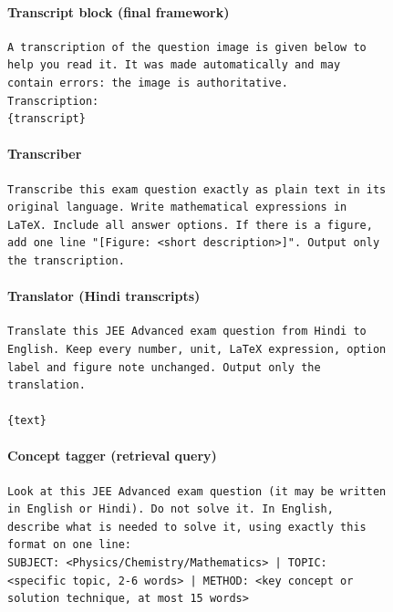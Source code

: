 \paragraph{Transcript block (final framework)}
\begin{scriptsize}\begin{verbatim}
A transcription of the question image is given below to
help you read it. It was made automatically and may
contain errors: the image is authoritative.
Transcription:
{transcript}
\end{verbatim}\end{scriptsize}

\paragraph{Transcriber}
\begin{scriptsize}\begin{verbatim}
Transcribe this exam question exactly as plain text in its
original language. Write mathematical expressions in
LaTeX. Include all answer options. If there is a figure,
add one line "[Figure: <short description>]". Output only
the transcription.
\end{verbatim}\end{scriptsize}

\paragraph{Translator (Hindi transcripts)}
\begin{scriptsize}\begin{verbatim}
Translate this JEE Advanced exam question from Hindi to
English. Keep every number, unit, LaTeX expression, option
label and figure note unchanged. Output only the
translation.

{text}
\end{verbatim}\end{scriptsize}

\paragraph{Concept tagger (retrieval query)}
\begin{scriptsize}\begin{verbatim}
Look at this JEE Advanced exam question (it may be written
in English or Hindi). Do not solve it. In English,
describe what is needed to solve it, using exactly this
format on one line:
SUBJECT: <Physics/Chemistry/Mathematics> | TOPIC:
<specific topic, 2-6 words> | METHOD: <key concept or
solution technique, at most 15 words>
\end{verbatim}\end{scriptsize}


